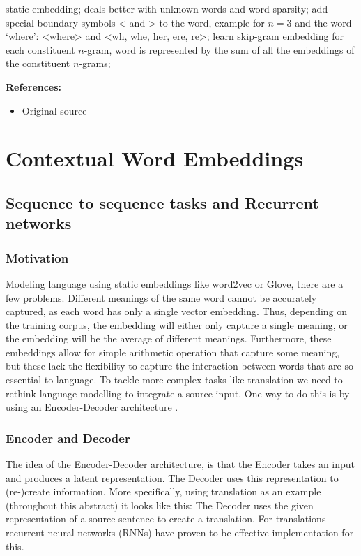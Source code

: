 \documentclass[11pt, a4paper]{amsart}
\begin{document}
{
\color{blue}

static embedding;
deals better with unknown words and word sparsity;
add special boundary symbols < and > to the word,
example for $n=3$ and the word `where':
<where> and <wh, whe, her, ere, re>;
learn skip-gram embedding for each constituent $n$-gram, word is represented by the sum of all the embeddings of the constituent $n$-grams;
} %

\noindent \textbf{References:}
\begin{itemize}
	\item Original source \cite{DBLP:journals/corr/BojanowskiGJM16}
\end{itemize}


\section{Contextual Word Embeddings}
\label{sec:contextual_word_embeddings}

\subsection{Sequence to sequence tasks and Recurrent networks}


\subsubsection{Motivation}

Modeling language using static embeddings like word2vec or Glove, there are a few problems. Different meanings of the same word cannot be accurately captured, as each word has only a single vector embedding. Thus, depending on the training corpus, the embedding will either only capture a single meaning, or the embedding will be the average of different meanings. Furthermore, these embeddings allow for simple arithmetic operation that capture some meaning, but these lack the flexibility to capture the interaction between words that are so essential to language. To tackle more complex tasks like translation we need to rethink language modelling to integrate a source input. One way to do this is by using an Encoder-Decoder architecture \cite{voitseq2seq}. 

\subsubsection{Encoder and Decoder}
The idea of the Encoder-Decoder architecture, is that the Encoder takes an input and produces a latent representation. The Decoder uses this representation to (re-)create information. More specifically, using translation as an example (throughout this abstract) it looks like this: The Decoder uses the given representation of a source sentence to create a translation. For translations recurrent neural networks (RNNs) have proven to be effective implementation for this.
\end{document}
